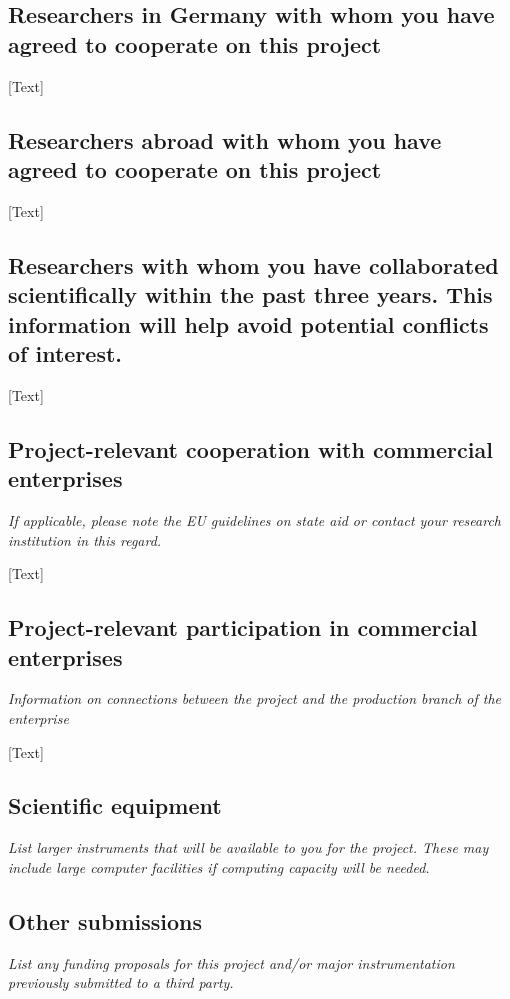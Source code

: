 \documentclass[11pt]{article} %
\begin{document}
\subsection{  Researchers in Germany with whom you have agreed to cooperate on this project }\label{sec:partners_ger}

[Text]

\subsection{  Researchers abroad with whom you have agreed to cooperate on this project }\label{sec:partners_int}

[Text]


\subsection{  Researchers with whom you have collaborated scientifically within the past three years. This information will help avoid potential conflicts of interest. }

[Text]


\subsection{  Project-relevant cooperation with commercial enterprises }
\textit{If applicable, please note the EU guidelines on state aid or contact your research institution in this regard.}
 
[Text]

\subsection{  Project-relevant participation in commercial enterprises }
\textit{Information on connections between the project and the production branch of the enterprise}

[Text]

\subsection{  Scientific equipment }
\textit{List larger instruments that will be available to you for the project. These may include large computer facilities if computing capacity will be needed. }



\subsection{  Other submissions }\label{sec:other_submissions}
\textit{List any funding proposals for this project and/or major instrumentation previously submitted to a third party. }
\end{document}
